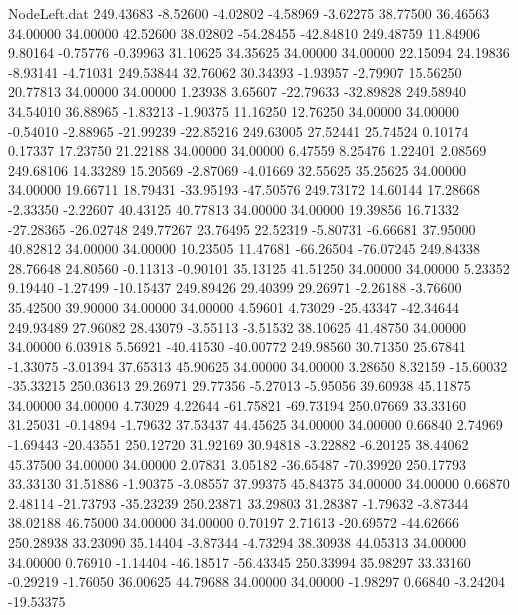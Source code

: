 \begin{filecontents}{NodeLeft.dat}
 249.43683   -8.52600   -4.02802    -4.58969   -3.62275   38.77500   36.46563   34.00000   34.00000   42.52600   38.02802  -54.28455  -42.84810
 249.48759   11.84906    9.80164    -0.75776   -0.39963   31.10625   34.35625   34.00000   34.00000   22.15094   24.19836   -8.93141   -4.71031
 249.53844   32.76062   30.34393    -1.93957   -2.79907   15.56250   20.77813   34.00000   34.00000    1.23938    3.65607  -22.79633  -32.89828
 249.58940   34.54010   36.88965    -1.83213   -1.90375   11.16250   12.76250   34.00000   34.00000   -0.54010   -2.88965  -21.99239  -22.85216
 249.63005   27.52441   25.74524     0.10174    0.17337   17.23750   21.22188   34.00000   34.00000    6.47559    8.25476    1.22401    2.08569
 249.68106   14.33289   15.20569    -2.87069   -4.01669   32.55625   35.25625   34.00000   34.00000   19.66711   18.79431  -33.95193  -47.50576
 249.73172   14.60144   17.28668    -2.33350   -2.22607   40.43125   40.77813   34.00000   34.00000   19.39856   16.71332  -27.28365  -26.02748
 249.77267   23.76495   22.52319    -5.80731   -6.66681   37.95000   40.82812   34.00000   34.00000   10.23505   11.47681  -66.26504  -76.07245
 249.84338   28.76648   24.80560    -0.11313   -0.90101   35.13125   41.51250   34.00000   34.00000    5.23352    9.19440   -1.27499  -10.15437
 249.89426   29.40399   29.26971    -2.26188   -3.76600   35.42500   39.90000   34.00000   34.00000    4.59601    4.73029  -25.43347  -42.34644
 249.93489   27.96082   28.43079    -3.55113   -3.51532   38.10625   41.48750   34.00000   34.00000    6.03918    5.56921  -40.41530  -40.00772
 249.98560   30.71350   25.67841    -1.33075   -3.01394   37.65313   45.90625   34.00000   34.00000    3.28650    8.32159  -15.60032  -35.33215
 250.03613   29.26971   29.77356    -5.27013   -5.95056   39.60938   45.11875   34.00000   34.00000    4.73029    4.22644  -61.75821  -69.73194
 250.07669   33.33160   31.25031    -0.14894   -1.79632   37.53437   44.45625   34.00000   34.00000    0.66840    2.74969   -1.69443  -20.43551
 250.12720   31.92169   30.94818    -3.22882   -6.20125   38.44062   45.37500   34.00000   34.00000    2.07831    3.05182  -36.65487  -70.39920
 250.17793   33.33130   31.51886    -1.90375   -3.08557   37.99375   45.84375   34.00000   34.00000    0.66870    2.48114  -21.73793  -35.23239
 250.23871   33.29803   31.28387    -1.79632   -3.87344   38.02188   46.75000   34.00000   34.00000    0.70197    2.71613  -20.69572  -44.62666
 250.28938   33.23090   35.14404    -3.87344   -4.73294   38.30938   44.05313   34.00000   34.00000    0.76910   -1.14404  -46.18517  -56.43345
 250.33994   35.98297   33.33160    -0.29219   -1.76050   36.00625   44.79688   34.00000   34.00000   -1.98297    0.66840   -3.24204  -19.53375

\end{filecontents}
